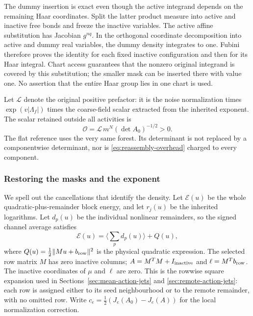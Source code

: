 The dummy insertion is exact even though the active integrand depends
on the remaining Haar coordinates. Split the latter product measure
into active and inactive free bonds and freeze the inactive variables.
The active affine substitution has Jacobian $g^{nq}$. In the orthogonal
coordinate decomposition into active and dummy real variables, the
dummy density integrates to one. Fubini therefore proves the identity
for each fixed inactive configuration and then for its Haar integral.
Chart access guarantees that the nonzero original integrand is covered
by this substitution; the smaller mask can be inserted there with value
one. No assertion that the entire Haar group lies in one chart is used.

Let $\mathscr L$ denote the original positive prefactor: it is the
noise normalization times $\exp(v|\Lambda_f|)$ times the coarse-field
scalar extracted from the inherited exponent. The scalar retained
outside all activities is
\begin{equation}\label{eq:reassembly-overhead}
                 \mathscr O=\mathscr L\,m^N(\det A_0)^{-1/2}>0.
\end{equation}
The flat reference uses the very same forest. Its determinant is not
replaced by a componentwise determinant, nor is \eqref{eq:reassembly-overhead}
charged to every component.

\subsubsection{Restoring the masks and the exponent}
We spell out the cancellations that identify the density. Let
$\mathscr E(u)$ be the whole quadratic-plus-remainder block energy,
and let $r_j(u)$ be the inherited logarithms. Let $d_p(u)$ be the
individual nonlinear remainders, so the signed channel average satisfies
\[
          \mathscr E(u)=\langle\textstyle\sum_p d_p(u)\rangle
                                      +Q(u),
\]
where $Q(u)=\frac12\|Mu+b_{\rm row}\|^2$ is the physical quadratic
expression. The selected row matrix $M$ has zero inactive columns;
$A=M^TM+I_{\rm inactive}$ and $\ell=M^Tb_{\rm row}$. The inactive
coordinates of $\mu$ and $\ell$ are zero. This is the rowwise square expansion used in
Sections~\ref{sec:mean-action-jets} and \ref{sec:remote-action-jets}:
each row is assigned either to its seed neighbourhood or to the remote
remainder, with no omitted row. Write $c_e=\frac12(J_e(A_0)-J_e(A))$
for the local normalization correction.

